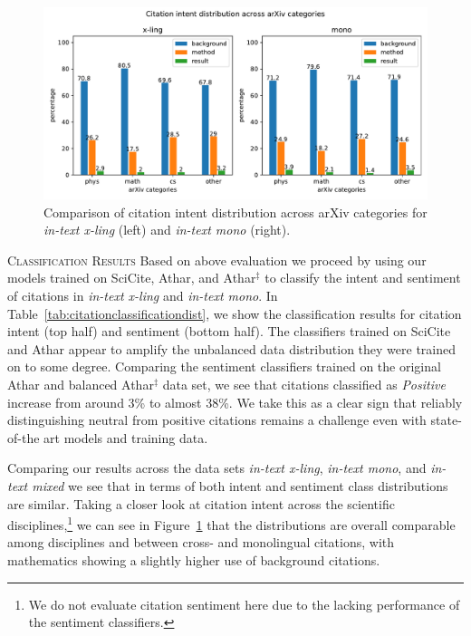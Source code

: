 \begin{figure}[tb]
\centering
\includegraphics[width=\linewidth]{figures/ref_xling/cross_ling_citation_intent_arxive_categories.pdf}
\caption[Comparison of citation intent distribution across arXiv categories for \textit{in-text x-ling} and \textit{in-text mono}]{Comparison of citation intent distribution across arXiv categories for \textit{in-text x-ling} (left) and \textit{in-text mono} (right).} \label{fig:intentarxivcategories}
\end{figure}

\textsc{Classification Results}
Based on above evaluation we proceed by using our models trained on SciCite, Athar, and Athar$^{\ddagger}$ to classify the intent and sentiment of citations in \textit{in-text x-ling} and \textit{in-text mono}.
In Table~\ref{tab:citationclassificationdist}, we show the classification results for citation intent (top half) and sentiment (bottom half). The classifiers trained on SciCite and Athar appear to amplify the unbalanced data distribution they were trained on to some degree. Comparing the sentiment classifiers trained on the original Athar and balanced Athar$^{\ddagger}$ data set, we see that citations classified as \textit{Positive} increase from around 3\% to almost 38\%. We take this as a clear sign that reliably distinguishing neutral from positive citations remains a challenge even with state-of-the art models and training data.

Comparing our results across the data sets \textit{in-text x-ling}, \textit{in-text mono}, and \textit{in-text mixed} we see that in terms of both intent and sentiment class distributions are similar. Taking a closer look at citation intent across the scientific disciplines,\footnote{We do not evaluate citation sentiment here due to the lacking performance of the sentiment classifiers.} we can see in Figure~\ref{fig:intentarxivcategories} that the distributions are overall comparable among disciplines and between cross- and monolingual citations, with mathematics showing a slightly higher use of background citations.


